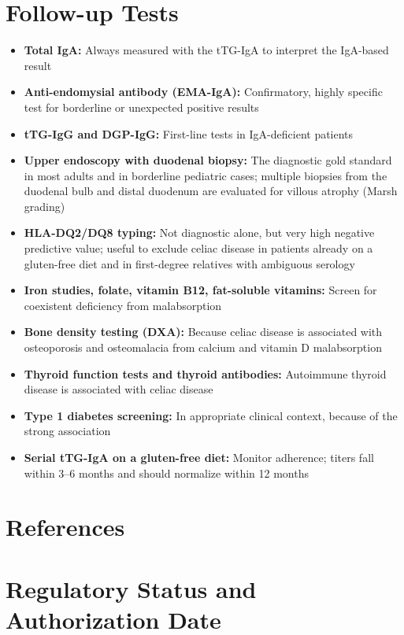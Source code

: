 \section*{Follow-up Tests}
\begin{itemize}
  \item \textbf{Total IgA:} Always measured with the tTG-IgA to interpret the IgA-based result
  \item \textbf{Anti-endomysial antibody (EMA-IgA):} Confirmatory, highly specific test for borderline or unexpected positive results
  \item \textbf{tTG-IgG and DGP-IgG:} First-line tests in IgA-deficient patients
  \item \textbf{Upper endoscopy with duodenal biopsy:} The diagnostic gold standard in most adults and in borderline pediatric cases; multiple biopsies from the duodenal bulb and distal duodenum are evaluated for villous atrophy (Marsh grading)
  \item \textbf{HLA-DQ2/DQ8 typing:} Not diagnostic alone, but very high negative predictive value; useful to exclude celiac disease in patients already on a gluten-free diet and in first-degree relatives with ambiguous serology
  \item \textbf{Iron studies, folate, vitamin B12, fat-soluble vitamins:} Screen for coexistent deficiency from malabsorption
  \item \textbf{Bone density testing (DXA):} Because celiac disease is associated with osteoporosis and osteomalacia from calcium and vitamin D malabsorption
  \item \textbf{Thyroid function tests and thyroid antibodies:} Autoimmune thyroid disease is associated with celiac disease
  \item \textbf{Type 1 diabetes screening:} In appropriate clinical context, because of the strong association
  \item \textbf{Serial tTG-IgA on a gluten-free diet:} Monitor adherence; titers fall within 3--6 months and should normalize within 12 months
\end{itemize}

\section*{References}



\clearpage
\section*{Regulatory Status and Authorization Date}

\clearpage
